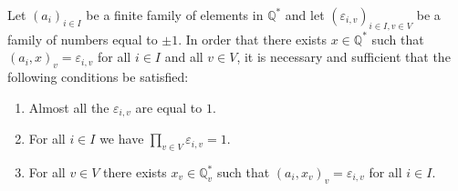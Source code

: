 Let $(a_i)_{i \in I}$ be a finite family of elements in $\mathbb{Q}^*$ and let $(\varepsilon_{i,v})_{i \in I, v \in V}$ be a family of numbers equal to $\pm 1$. In order that there exists $x \in \mathbb{Q}^*$ such that $(a_i, x)_v = \varepsilon_{i,v}$ for all $i \in I$ and all $v \in V$, it is necessary and sufficient that the following conditions be satisfied:

\begin{enumerate}
\item[(1)] Almost all the $\varepsilon_{i,v}$ are equal to $1$.
\item[(2)] For all $i \in I$ we have $\prod_{v \in V} \varepsilon_{i,v} = 1$.
\item[(3)] For all $v \in V$ there exists $x_v \in \mathbb{Q}^*_v$ such that $(a_i, x_v)_v = \varepsilon_{i,v}$ for all $i \in I$.
\end{enumerate}
